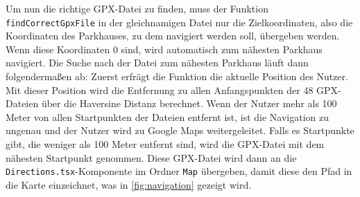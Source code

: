 Um nun die richtige GPX-Datei zu finden, muss der Funktion \verb|findCorrectGpxFile| in der gleichnamigen Datei nur die Zielkoordinaten, also die Koordinaten des Parkhauses, zu dem navigiert werden soll, übergeben werden. Wenn diese Koordinaten 0 sind, wird automatisch zum nähesten Parkhaus navigiert. Die Suche nach der Datei zum nähesten Parkhaus läuft dann folgendermaßen ab: Zuerst erfrägt die Funktion die aktuelle Position des Nutzer. Mit dieser Position wird die Entfernung zu allen Anfangspunkten der 48 GPX-Dateien über die Haversine Distanz berechnet. Wenn der Nutzer mehr als 100 Meter von allen Startpunkten der Dateien entfernt ist, ist die Navigation zu ungenau und der Nutzer wird zu Google Maps weitergeleitet. Falls es Startpunkte gibt, die weniger als 100 Meter entfernt sind, wird die GPX-Datei mit dem nähesten Startpunkt genommen. Diese GPX-Datei wird dann an die \verb|Directions.tsx|-Komponente im Ordner \verb|Map| übergeben, damit diese den Pfad in die Karte einzeichnet, was in \autoref{fig:navigation} gezeigt wird.

